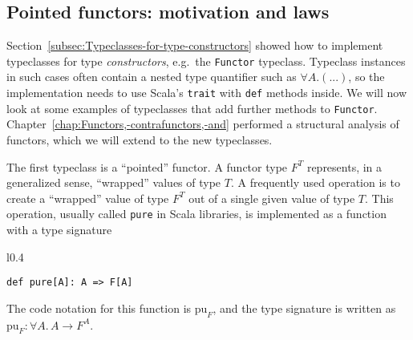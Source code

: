 \subsection{Pointed functors: motivation and laws\label{subsec:Pointed-functors:-motivation}}

Section~\ref{subsec:Typeclasses-for-type-constructors} showed how
to implement typeclasses for type \emph{constructors}, e.g.~the \lstinline!Functor!
typeclass. Typeclass instances in such cases often contain a nested
type quantifier such as $\forall A.\left(...\right)$, so the implementation
needs to use Scala's \lstinline!trait! with \lstinline!def! methods
inside. We will now look at some examples of typeclasses that add
further methods to \lstinline!Functor!. Chapter~\ref{chap:Functors,-contrafunctors,-and}
performed a structural analysis of functors, which we will extend
to the new typeclasses.

The first typeclass is a ``pointed'' functor. A functor type $F^{T}$
represents, in a generalized sense, ``wrapped'' values of type $T$.
A frequently used operation is to create a ``wrapped'' value of
type $F^{T}$ out of a single given value of type $T$. This operation,
usually called \lstinline!pure! in Scala libraries, is implemented
as a function with a type signature

\begin{wrapfigure}{l}{0.4\columnwidth}%
\vspace{-0.8\baselineskip}
\begin{lstlisting}
def pure[A]: A => F[A]
\end{lstlisting}
\vspace{-0.8\baselineskip}
\end{wrapfigure}%

\noindent The code notation for this function is $\text{pu}_{F}$,
and the type signature is written as $\text{pu}_{F}:\forall A.\,A\rightarrow F^{A}$. 

